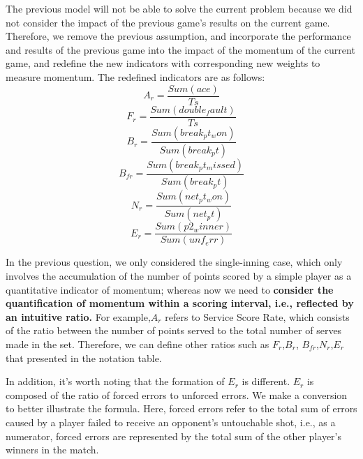 \documentclass{mcmthesis}
\begin{document}
 The previous model will not be able to solve the current problem because we did not consider
the impact of the previous game's results on the current game. Therefore, we remove the previous
assumption, and incorporate the performance and results of the previous game into the impact of
the momentum of the current game, and redefine the new indicators with corresponding new
weights to measure momentum. The redefined indicators are as follows:
\begin{equation} \label{7}
    A_{r}=\frac{Sum(ace)}{Ts}
\end{equation}
\begin{equation} \label{8}
    F_{r}=\frac{Sum(double_fault)}{Ts}
\end{equation}
\begin{equation} \label{9}
    B_{r}=\frac{Sum(break_pt_won)}{Sum(break_pt)}
\end{equation}
\begin{equation} \label{10}
    B_{fr}=\frac{Sum(break_pt_missed)}{Sum(break_pt)}
\end{equation}
\begin{equation} \label{11}
    N_{r}=\frac{Sum(net_pt_won)}{Sum(net_pt)}
\end{equation}
\begin{equation} \label{12}
    E_{r}=\frac{Sum(p2_winner)}{Sum(unf_err)}
\end{equation}

In the previous question, we only considered the single-inning case, which only involves the
accumulation of the number of points scored by a simple player as a quantitative indicator of
momentum; whereas now we need to {\bf consider the quantification of momentum within a
scoring interval, i.e., reflected by an intuitive ratio.} For example,$A_{r}$
refers to Service Score Rate, which consists of the ratio between the number of points served to the total number of serves
made in the set. Therefore, we can define other ratios such as $F_{r}$,$B_{r}$, $B_{fr}$,$N_{r}$,$E_{r}$
that presented in
the notation table. 

In addition, it's worth noting that the formation of $E_{r}$ is different. $E_{r}$ is composed of the ratio
of forced errors to unforced errors. We make a conversion to better illustrate the formula. Here, forced errors refer to the total sum of errors caused by a player failed to receive an opponent's
untouchable shot, i.e., as a numerator, forced errors are represented by the total sum of the other
player's winners in the match.
\end{document}
